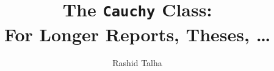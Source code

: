 
\title[Cauchy Class Demo]{The \texttt{Cauchy} Class:\\For Longer Reports, Theses, \dots}
\author{Rashid Talha}


\newcommand{\usubtitle}{This is an optional subtitle}
\newcommand{\uaffiliation}{Scuola Internazionale Superiore di Studi Avanzati (SISSA), Trieste, Italy}
\newcommand{\udate}{May, 2026}
\newcommand{\uwebsite}{\url{rashidtalha.github.io}}
